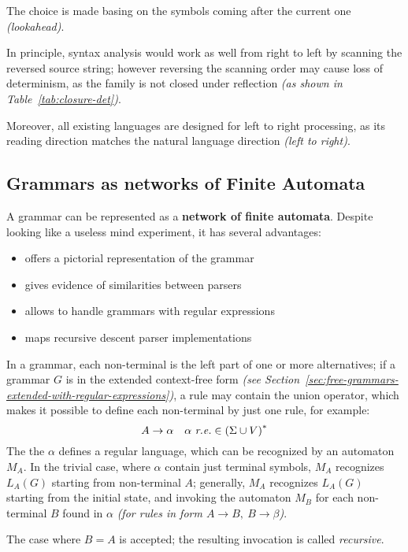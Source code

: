 \documentclass[english]{article}
\begin{document}
The choice is made basing on the symbols coming after the current one \textit{(lookahead)}.

\bigskip
In principle, syntax analysis would work as well from right to left by scanning the reversed source string;
however reversing the scanning order may cause loss of determinism, as the \DET family is not closed under reflection \textit{(as shown in Table~\ref{tab:closure-det})}.

Moreover, all existing languages are designed for left to right processing, as its reading direction matches the natural language direction \textit{(left to right)}.

\subsection{Grammars as networks of Finite Automata}

A grammar can be represented as a \textbf{network of finite automata}.
Despite looking like a useless mind experiment, it has several advantages:

\begin{itemize}
  \item offers a pictorial representation of the grammar
  \item gives evidence of similarities between parsers
  \item allows to handle grammars with regular expressions
  \item maps recursive descent parser implementations
\end{itemize}

\bigskip
In a grammar, each non-terminal is the left part of one or more alternatives;
if a grammar \(G\) is in the extended context-free form \textit{(see Section~\ref{sec:free-grammars-extended-with-regular-expressions})}, a rule \RP may contain the union operator, which makes it possible to define each non-terminal by just one rule, for example:
\[ A \rightarrow \alpha \quad \alpha \ \textit{r.e.} \in \left( \Sigma \cup V \right)^\ast \]
The the \re \(\alpha\) defines a regular language, which can be recognized by an automaton \(M_A\).
In the trivial case, where \(\alpha\) contain just terminal symbols, \(M_A\) recognizes \(L_A(G)\) starting from non-terminal \(A\);
generally, \(M_A\) recognizes \(L_A(G)\) starting from the initial state, and invoking the automaton \(M_{B}\) for each non-terminal \(B\) found in \(\alpha\) \textit{(for rules in form \(A \rightarrow B,\  B \rightarrow \beta\))}.

The case where \(B = A\) is accepted; the resulting invocation is called \textit{recursive}.
\end{document}
